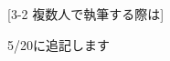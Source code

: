\newpage
\pagestyle{leaflet}
[3-2 複数人で執筆する際は]
\begin{multicols*}{2}
\begin{center}
    {\selectsize{13pt}{13pt}5/20に追記します}
\end{center}
\end{multicols*}



\begin{comment}

    
    \newcolumn
    
    \section{規則}
    \hspace{1zw}複数人で執筆を行う際、対策をしないと全ての原稿を合わせた時にフォーマットが所々違う、変な冊子が出来上がってしまいます。
    これを防ぐため、このセクションでは要綱執筆時の統一したルールを書いていきたいと思います。\\
    \indent まだ書いていません。ごめんなさい。そのうちやります。\\
    \begin{comment}
    \subsection{1}{文字のルール}
    
    \subsection{2}{画像の入れ方}
    
    \subsection{3}{リストの使い方}
    
    \subsection{4}{枠囲み}
    
    \subsection{5}{文献参照}
    
    \subsection{6}{索引対象となる用語}


\end{comment}
